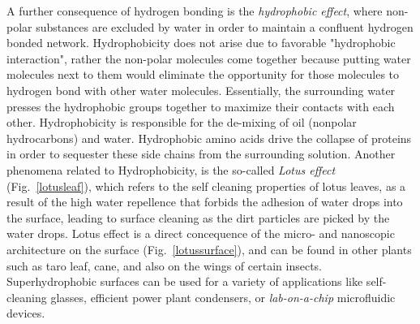 \documentclass[book.tex]{subfiles}
\begin{document}
A further consequence of hydrogen bonding is the \textit{hydrophobic effect}, where non-polar substances are excluded by water in order to maintain a confluent hydrogen bonded network. Hydrophobicity does not arise due to favorable "hydrophobic interaction", rather the non-polar molecules come together because putting water molecules next to them would eliminate the opportunity for those molecules to hydrogen bond with other water molecules. Essentially, the surrounding water presses the hydrophobic groups together to maximize their contacts with each other. Hydrophobicity is responsible for the de-mixing of oil (nonpolar hydrocarbons) and water. Hydrophobic amino acids drive the collapse of proteins in order to sequester these side chains from the surrounding solution. 
Another phenomena related to Hydrophobicity, is the so-called \textit{Lotus effect} (Fig.~\ref{lotusleaf}), which refers to the self cleaning properties of lotus leaves, as a result of the high water repellence that forbids the adhesion of water drops into the surface, leading to surface cleaning as the dirt particles are picked by the water drops. Lotus effect is a direct concequence of the micro- and nanoscopic architecture on the surface (Fig.~\ref{lotussurface}), and can be found in other plants such as taro leaf, cane, and also on the wings of certain insects. Superhydrophobic surfaces can be used for a variety of applications like self-cleaning glasses, efficient power plant condensers, or \textit{lab-on-a-chip} microfluidic devices.
\end{document}
